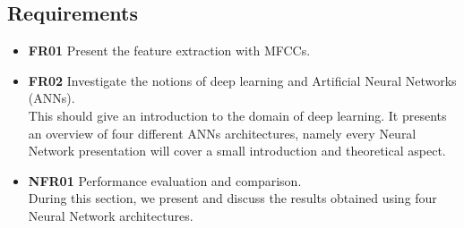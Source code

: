 
\subsection{Requirements}

\begin{itemize} 
  \item \textbf{FR01} Present the feature extraction with MFCCs. \\
  \item \textbf{FR02} Investigate the notions of deep learning and Artificial
    Neural Networks (ANNs).\\
    This should give an introduction to the domain of deep learning. It presents
    an overview of four different ANNs architectures, namely every Neural
    Network presentation will cover a small introduction and theoretical
    aspect.\\
  \item \textbf{NFR01} Performance evaluation and comparison.\\ 
    During this section, we present and discuss the results obtained using four
    Neural Network architectures.
\end{itemize}
